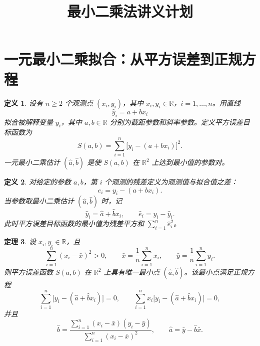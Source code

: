 \documentclass[UTF8,fontset=fandol,11pt]{ctexart}
\title{最小二乘法讲义计划}
\date{}
\newtheorem{definition}{定义}[section]
\newtheorem{theorem}[definition]{定理}
\begin{document}
\maketitle
\section{一元最小二乘拟合：从平方误差到正规方程}\label{sec:S01}
\begin{definition}
设有 $n\geq 2$ 个观测点 $(x_i,y_i)$，其中 $x_i,y_i\in\mathbb{R}$，$i=1,\ldots,n$。用直线
\[
\hat y_i=a+bx_i
\]
拟合被解释变量 $y_i$，其中 $a,b\in\mathbb{R}$ 分别为截距参数和斜率参数。定义平方误差目标函数为
\begin{equation}
S(a,b)=\sum_{i=1}^{n}\bigl[y_i-(a+bx_i)\bigr]^2.
\label{def:ols-objective}
\end{equation}
一元最小二乘估计 $(\hat a,\hat b)$ 是使 $S(a,b)$ 在 $\mathbb{R}^2$ 上达到最小值的参数对。
\end{definition}
\begin{definition}
对给定的参数 $a,b$，第 $i$ 个观测的残差定义为观测值与拟合值之差：
\begin{equation}
e_i=y_i-(a+bx_i).
\label{def:residual}
\end{equation}
当参数取最小二乘估计 $(\hat a,\hat b)$ 时，记
\[
\hat y_i=\hat a+\hat b x_i,
\qquad
\hat e_i=y_i-\hat y_i.
\]
此时平方误差目标函数的最小值为残差平方和 $\sum_{i=1}^n\hat e_i^2$。
\end{definition}
\begin{theorem}
设 $x_i,y_i\in\mathbb{R}$，且
\label{thm:quadratic-unique-minimum}
\[
\sum_{i=1}^{n}(x_i-\bar x)^2>0,
\qquad
\bar x=\frac{1}{n}\sum_{i=1}^{n}x_i,
\qquad
\bar y=\frac{1}{n}\sum_{i=1}^{n}y_i.
\]
则平方误差函数 $S(a,b)$ 在 $\mathbb{R}^2$ 上具有唯一最小点 $(\hat a,\hat b)$。该最小点满足正规方程
\begin{equation}
\sum_{i=1}^{n}\bigl[y_i-(\hat a+\hat b x_i)\bigr]=0,
\qquad
\sum_{i=1}^{n}x_i\bigl[y_i-(\hat a+\hat b x_i)\bigr]=0,
\label{thm:normal-equations}
\end{equation}
并且
\[
\hat b=\frac{\sum_{i=1}^{n}(x_i-\bar x)(y_i-\bar y)}{\sum_{i=1}^{n}(x_i-\bar x)^2},
\qquad
\hat a=\bar y-\hat b\bar x.
\]
\end{theorem}
\end{document}
